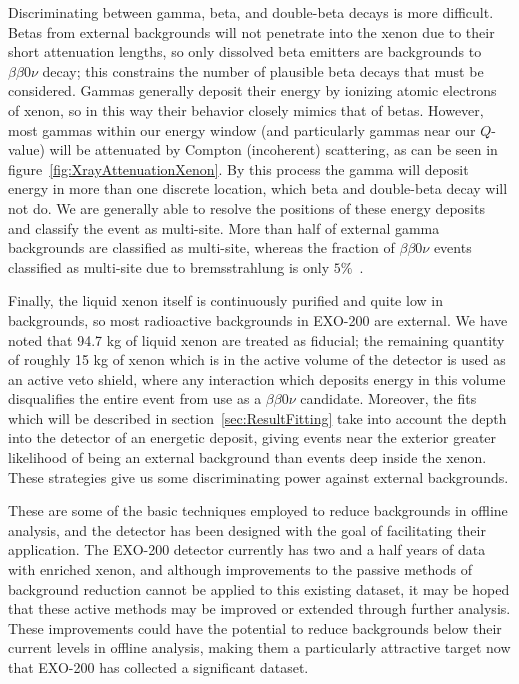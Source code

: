 Discriminating between gamma, beta, and double-beta decays is more difficult.  Betas from external backgrounds will not penetrate into the xenon due to their short attenuation lengths, so only dissolved beta emitters are backgrounds to $\beta\beta 0\nu$ decay; this constrains the number of plausible beta decays that must be considered.  Gammas generally deposit their energy by ionizing atomic electrons of xenon, so in this way their behavior closely mimics that of betas.  However, most gammas within our energy window (and particularly gammas near our $Q$-value) will be attenuated by Compton (incoherent) scattering, as can be seen in figure~\ref{fig:XrayAttenuationXenon}.  By this process the gamma will deposit energy in more than one discrete location, which beta and double-beta decay will not do.  We are generally able to resolve the positions of these energy deposits and classify the event as multi-site. More than half of external gamma backgrounds are classified as multi-site, whereas the fraction of $\beta\beta 0\nu$ events classified as multi-site due to bremsstrahlung is only $5\%$~\cite{bb2nEXO2014}.

Finally, the liquid xenon itself is continuously purified and quite low in backgrounds, so most radioactive backgrounds in EXO-200 are external.  We have noted that 94.7 kg of liquid xenon are treated as fiducial; the remaining quantity of roughly 15 kg of xenon which is in the active volume of the detector is used as an active veto shield, where any interaction which deposits energy in this volume disqualifies the entire event from use as a $\beta\beta 0\nu$ candidate.  Moreover, the fits which will be described in section~\ref{sec:ResultFitting} take into account the depth into the detector of an energetic deposit, giving events near the exterior greater likelihood of being an external background than events deep inside the xenon.  These strategies give us some discriminating power against external backgrounds.

These are some of the basic techniques employed to reduce backgrounds in offline analysis, and the detector has been designed with the goal of facilitating their application.  The EXO-200 detector currently has two and a half years of data with enriched xenon, and although improvements to the passive methods of background reduction cannot be applied to this existing dataset, it may be hoped that these active methods may be improved or extended through further analysis.  These improvements could have the potential to reduce backgrounds below their current levels in offline analysis, making them a particularly attractive target now that EXO-200 has collected a significant dataset.

